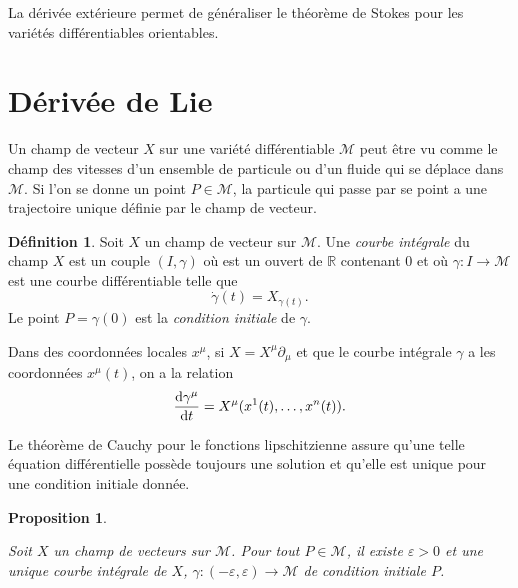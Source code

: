 \documentclass[a4paper,11pt]{report}
\theoremstyle{definition}
\theoremstyle{plain}
\newtheorem{prop}[thm]{Proposition}
\theoremstyle{definition}
\newtheorem{defn}{Définition}[chapter]
\theoremstyle{remark}
\newcommand{\M}{\mathscr{M}}
\newcommand{\p}{\partial}
\begin{document}
            La dérivée extérieure permet de généraliser le théorème de Stokes pour les variétés différentiables orientables.
            
        \section{Dérivée de Lie}
            
            Un champ de vecteur $X$ sur une variété différentiable $\M$ peut être vu comme le champ des vitesses d'un ensemble de particule ou d'un fluide qui se déplace dans $\M$. Si l'on se donne un point $P\in\M$, la particule qui passe par se point a une trajectoire unique définie par le champ de vecteur.
            
            \begin{defn}
             Soit $X$ un champ de vecteur sur $\M$. Une \textit{courbe intégrale} du champ $X$ est un couple $(I,\gamma)$ où est un ouvert de $\mathbb{R}$ contenant 0 et où $\gamma:I\to\M$ est une courbe différentiable telle que
             \begin{equation}
                 \dot{\gamma}(t) = X_{\gamma(t)}.
             \end{equation}
             Le point $P = \gamma(0)$ est la \textit{condition initiale} de $\gamma$.
            \end{defn}
            
            Dans des coordonnées locales $x^\mu$, si $X = X^\mu\p_\mu$ et que le courbe intégrale $\gamma$ a les coordonnées $x^\mu(t)$, on a la relation
            \begin{align}
                \dv{\gamma^\mu}{t} = X^\mu(x^1(t),\dots,x^n(t)).
            \end{align}
            
            Le théorème de Cauchy pour le fonctions lipschitzienne assure qu'une telle équation différentielle possède toujours une solution et qu'elle est unique pour une condition initiale donnée.
            
            \begin{prop}
            \begin{leftbar}
                Soit $X$ un champ de vecteurs sur $\M$. Pour tout $P\in\M$, il existe $\varepsilon>0$ et une unique courbe intégrale de $X$, $\gamma:(-\varepsilon,\varepsilon)\to\M$ de condition initiale $P$.
            \end{leftbar}
            \end{prop}
            
\end{document}
